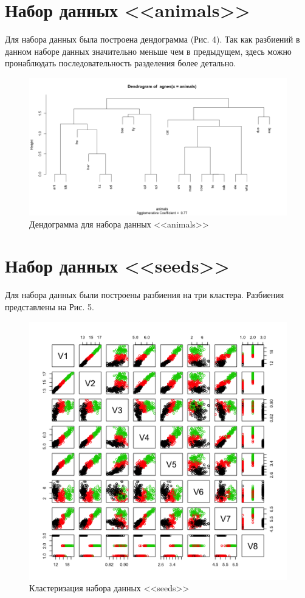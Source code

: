\documentclass[]{article}
\numberwithin{equation}{section}
\begin{document}
    \section{Набор данных <<animals>>}

    Для набора данных была построена дендограмма (Рис. 4). Так как разбиений в данном наборе данных значительно меньше чем в предыдущем, здесь можно пронаблюдать последовательность разделения более детально.

    \begin{figure}[H]
        \centering
        \includegraphics[width = 0.9\linewidth]{data/animals.png}
        \caption{Дендограмма для набора данных <<animals>>}
    \end{figure}

    \section{Набор данных <<seeds>>}

    Для набора данных были построены разбиения на три кластера. Разбиения представлены на Рис. 5.

    \begin{figure}[H]
        \centering
        \includegraphics[width = 0.9\linewidth]{data/seeds.png}
        \caption{Кластеризация набора данных <<seeds>>}
    \end{figure}
\end{document}
